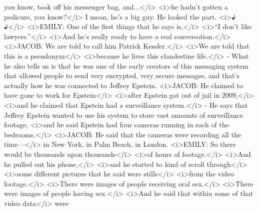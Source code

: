 \begin{itemize}
  you know, took off his messenger bag,
  and...\textless{}/i\textgreater{} \textless{}i\textgreater{}he hadn't
  gotten a pedicure, you know?\textless{}/i\textgreater{} I mean, he's a
  big guy. He looked the part. \textless{}i\textgreater{}♪
  ♪\textless{}/i\textgreater{} \textless{}i\textgreater{}EMILY: One of
  the first things that he says is,\textless{}/i\textgreater{}
  \textless{}i\textgreater{}``I don't like
  lawyers.''\textless{}/i\textgreater{} \textless{}i\textgreater{}And
  he's really ready to have a real
  conversation.\textless{}/i\textgreater{}
  \textless{}i\textgreater{}JACOB: We are told to call him Patrick
  Kessler.\textless{}/i\textgreater{} \textless{}i\textgreater{}We are
  told that this is a pseudonym\textless{}/i\textgreater{}
  \textless{}i\textgreater{}because he lives this clandestine
  life.\textless{}/i\textgreater{} - What he also tells us is that he
  was one of the early creators of this messaging system that allowed
  people to send very encrypted, very secure messages, and that's
  actually how he was connected to Jeffrey Epstein.
  \textless{}i\textgreater{}JACOB: He claimed to have gone to work for
  Epstein\textless{}/i\textgreater{} \textless{}i\textgreater{}after
  Epstein got out of jail in 2009,\textless{}/i\textgreater{}
  \textless{}i\textgreater{}and he claimed that Epstein had a
  surveillance system.\textless{}/i\textgreater{} - He says that Jeffrey
  Epstein wanted to use his system to store vast amounts of surveillance
  footage, \textless{}i\textgreater{}and he said Epstein had four
  cameras running in each of the bedrooms.\textless{}/i\textgreater{}
  \textless{}i\textgreater{}JACOB: He said that the cameras were
  recording all the time---\textless{}/i\textgreater{} in New York, in
  Palm Beach, in London. \textless{}i\textgreater{}EMILY: So there would
  be thousands upon thousands\textless{}/i\textgreater{}
  \textless{}i\textgreater{}of hours of
  footage.\textless{}/i\textgreater{} \textless{}i\textgreater{}And he
  pulled out his phone,\textless{}/i\textgreater{}
  \textless{}i\textgreater{}and he started to kind of scroll
  through\textless{}/i\textgreater{} \textless{}i\textgreater{}some
  different pictures that he said were stills\textless{}/i\textgreater{}
  \textless{}i\textgreater{}from the video
  footage.\textless{}/i\textgreater{} \textless{}i\textgreater{}There
  were images of people receiving oral sex.\textless{}/i\textgreater{}
  \textless{}i\textgreater{}There were images of people having
  sex.\textless{}/i\textgreater{} \textless{}i\textgreater{}And he said
  that within some of that video data\textless{}/i\textgreater{} were

\end{itemize}
